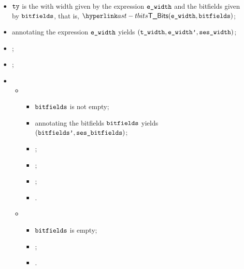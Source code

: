 \ProseParagraph
\AllApply
\begin{itemize}
  \item $\texttt{ty}$ is the \bitvectortypeterm{} with width given by the expression
    $\texttt{e\_width}$ and the bitfields given by $\texttt{bitfields}$, that is, $\TBits(\ewidth, \bitfields)$;
  \item annotating the expression $\texttt{e\_width}$ yields $(\texttt{t\_width}, \texttt{e\_width'}, \texttt{ses\_width})$\ProseOrTypeError;
  \item \Prosechecksymbolicallyevaluable{\seswidth};
  \item \Prosecheckconstrainedinteger{$\tenv$}{$\twidth$};
  \item \OneApplies
  \begin{itemize}
    \item {}
    \begin{itemize}
      \item $\texttt{bitfields}$ is not empty;
      \item annotating the bitfields $\texttt{bitfields}$ yields \\
            $(\texttt{bitfields'}, \texttt{ses\_bitfields})$\ProseOrTypeError;
      \item \Prosestaticeval{$\tenv$}{$\ewidthp$}{$\lint(\vwidth)$};
      \item \Prosecheckcommonbitfieldsalign{$\tenv$}{$\bitfieldsp$}{$\vwidth$}\ProseOrTypeError;
      \item {};
      \item {}.
    \end{itemize}

    \item {}
    \begin{itemize}
      \item $\texttt{bitfields}$ is empty;
      \item {};
      \item \Proseeqdef{$\vses$}{$\seswidth$}.
    \end{itemize}
  \end{itemize}
\end{itemize}

